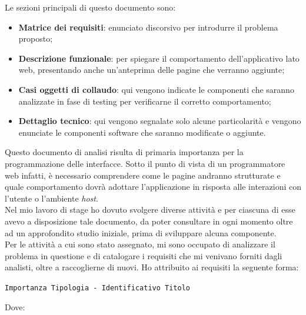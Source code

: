 	Le sezioni principali di questo documento sono:
	
	\begin{itemize}
		\item \textbf{Matrice dei requisiti}: enunciato discorsivo per introdurre il problema proposto;
		\item \textbf{Descrizione funzionale}: per spiegare il comportamento dell'applicativo lato web, presentando anche un'anteprima delle pagine che verranno aggiunte;
		\item \textbf{Casi oggetti di collaudo}: qui vengono indicate le componenti che saranno analizzate in fase di testing per verificarne il corretto comportamento;
		\item \textbf{Dettaglio tecnico}: qui vengono segnalate solo alcune particolarità e vengono enunciate le componenti software che saranno modificate o aggiunte.	
	\end{itemize}
	
	Questo documento di analisi risulta di primaria importanza per la programmazione delle interfacce. Sotto il punto di vista di un programmatore web infatti, è necessario comprendere come le pagine andranno strutturate e quale comportamento dovrà adottare l'applicazione in risposta alle interazioni con l'utente o l'ambiente \textit{host}.\\
	
	Nel mio lavoro di stage ho dovuto svolgere diverse attività e per ciascuna di esse avevo a disposizione tale documento, da poter consultare in ogni momento oltre ad un approfondito studio iniziale, prima di sviluppare alcuna componente.\\
	
	Per le attività a cui sono stato assegnato, mi sono occupato di analizzare il problema in questione e di catalogare i requisiti che mi venivano forniti dagli analisti, oltre a raccoglierne di nuovi. Ho attribuito ai requisiti la seguente forma:
	
	\begin{center}
		\texttt{Importanza Tipologia - Identificativo \hspace{1cm} Titolo}
	\end{center}
	
	Dove:
	
